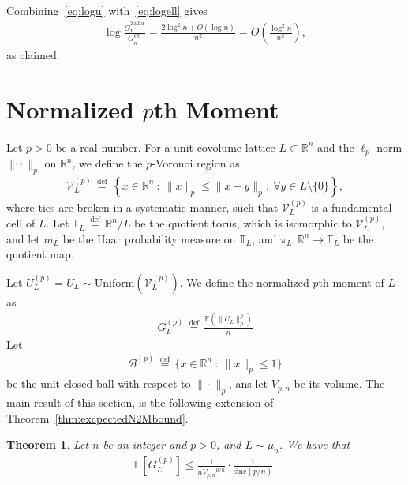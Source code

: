 \documentclass[article,doublecolumn]{IEEEtran}
\newcommand{\EE}{{\mathbb{E}}}
\newcommand{\df}{{\, \stackrel{\mathrm{def}}{=}\, }}
\newcommand{\R}{{\mathbb{R}}}
\newcommand{\TT}{{\mathbb{T}}}
\newcommand{\Unif}{\mathrm{Uniform}}
\newcommand{\mVLp}{{\mathcal{V}^{(p)}_L}}
\newcommand{\mBp}{{\mathcal{B}^{(p)}}}
\newcommand{\Vp}{{V_{p,n}}}
\newcommand{\GPl}{{G^{(p)}_L}}
\newcommand{\sinc}{{\mathrm{sinc}}}
\newtheorem{thm}{Theorem}[section]
\begin{document}
Combining~\eqref{eq:logu} with~\eqref{eq:logell} gives
\begin{align}
\log\frac{\overline{G}_n^{\mathrm{Zador}}}{\underline{G}^{\mathrm{CS}}_n}
=\frac{2\log^2 n+O(\log n)}{n^2}=O\left(\frac{\log^2 n}{n^2} \right),
\end{align}
as claimed.


\section{Normalized $p$th Moment}
\label{app:pmoment}
Let $p>0$ be a real number. For a unit covolume lattice $L\subset \mathbb{R}^n$ and the $\ell_p$ norm $\|\cdot\|_p$ on $\R^n$, we define the $p$-Voronoi region as
\begin{align}
\mVLp\df\left\{x\in \R^n~:~\|x\|_p\leq \|x-y\|_p,~\forall y\in L\setminus\{0\} \right\},   
\end{align}
where ties are broken in a systematic manner, such that $\mVLp$ is a fundamental cell of $L$. Let 
$\TT_L \df \R^n/L$ be the quotient torus, which is isomorphic to $\mVLp$, and let $m_L$ be the Haar probability
measure on $\TT_L$, and $\pi_L : \R^n \to
\TT_L$ be the quotient map.  

Let $U^{(p)}_L=U_L\sim\Unif(\mVLp)$. We define the normalized $p$th moment of $L$ as
\begin{align}
\GPl\df \frac{\EE(\|U_L\|^p_p)}{n}
\end{align}
Let 
\begin{align}
\mBp\df\{x\in\R^n~:~\|x\|_p\leq  1\}    
\end{align}
be the unit closed ball with respect to $\|\cdot\|_p$, ans let $\Vp$ be its volume. The main result of this section, is the following extension of Theorem~\ref{thm:excpectedN2Mbound}.
\begin{thm}
\label{thm:excpectedNpMbound}
 Let $n$ be an integer and $p>0$, and $L\sim\mu_n$. We have that
 \begin{align}
 \EE[\GPl]\leq \frac{1}{n\Vp^{p/n}}\cdot\frac{1}{\sinc(p/n)}.
 \end{align}
 \end{thm}
\end{document}
